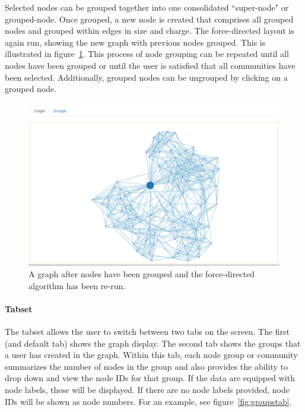 \documentclass{article}\usepackage[]{graphicx}\usepackage[]{color}
\newcommand{\ak}[1]{{\color{blue} #1}}
\begin{document}
Selected nodes can be grouped together into one consolidated ``super-node" or grouped-node. \ak{Once grouped, a new node is created that comprises all grouped nodes and grouped within edges in size and charge}. The force-directed layout is again run, showing the new graph with previous nodes grouped. This is illustrated in figure~\ref{fig:graphgroup}. This process of node grouping can be repeated until all nodes have been grouped or until the user is satisfied that all communities have been selected. Additionally, grouped nodes can be ungrouped by clicking on a grouped node. 

\begin{figure}[H]
\centering
\includegraphics[width=\textwidth]{images/graphgroup.png}
\caption{\label{fig:graphgroup} A graph after nodes have been grouped and the force-directed algorithm has been re-run.}
\end{figure}

\paragraph{Tabset}
The tabset allows the user to switch between two tabs on the screen. The first (and default tab) shows the graph display. The second tab shows the groups that a user has created in the graph. Within this tab, each node group or community summarizes the number of nodes in the group and also provides the ability to drop down and view the node IDs for that group. If the data are equipped with node labels, these will be displayed. If there are no node labels provided, node IDs will be shown as node numbers. For an example, see figure~\ref{fig:groupstab}.
\end{document}
